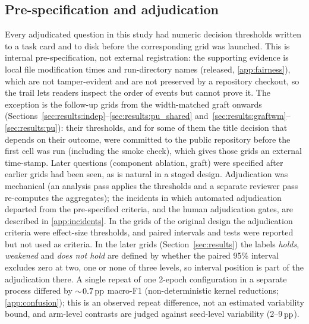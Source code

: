 \subsection{Pre-specification and adjudication}
\label{sec:protocol:prereg}

Every adjudicated question in this study had numeric decision thresholds written to a task card and to disk before the corresponding grid was launched. This is internal pre-specification, not external registration: the supporting evidence is local file modification times and run-directory names (released, \ref{app:fairness}), which are not tamper-evident and are not preserved by a repository checkout, so the trail lets readers inspect the order of events but cannot prove it. The exception is the follow-up grids from the width-matched graft onwards (Sections~\ref{sec:results:indep}--\ref{sec:results:pu_shared} and~\ref{sec:results:graftwm}--\ref{sec:results:pu}): their thresholds, and for some of them the title decision that depends on their outcome, were committed to the public repository before the first cell was run (including the smoke check), which gives those grids an external time-stamp. Later questions (component ablation, graft) were specified after earlier grids had been seen, as is natural in a staged design. Adjudication was mechanical (an analysis pass applies the thresholds and a separate reviewer pass re-computes the aggregates); the incidents in which automated adjudication departed from the pre-specified criteria, and the human adjudication gates, are described in \ref{app:incidents}. In the grids of the original design the adjudication criteria were effect-size thresholds, and paired intervals and tests were reported but not used as criteria. In the later grids (Section~\ref{sec:results}) the labels \emph{holds}, \emph{weakened} and \emph{does not hold} are defined by whether the paired 95\% interval excludes zero at two, one or none of three levels, so interval position is part of the adjudication there. A single repeat of one 2-epoch configuration in a separate process differed by $\sim\!0.7\,\mathrm{pp}$ macro-F1 (non-deterministic kernel reductions; \ref{app:confusion}); this is an observed repeat difference, not an estimated variability bound, and arm-level contrasts are judged against seed-level variability (2--9$\,\mathrm{pp}$).
